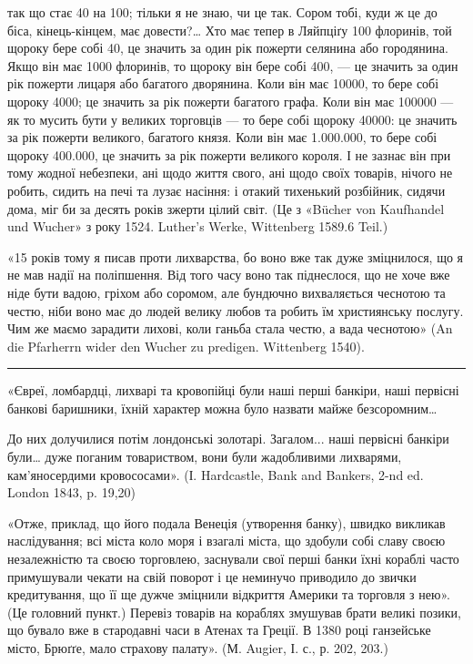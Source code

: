 \parcont{}  %
так що стає 40 на 100; тільки я не знаю, чи це так. Сором тобі, куди ж це
до біса, кінець-кінцем, має довести?\dots{} Хто має тепер в Ляйпціґу 100 флоринів,
той щороку бере собі 40, це значить за один рік пожерти селянина або городянина.
Якщо він має 1000 флоринів, то щороку він бере собі 400, — це значить
за один рік пожерти лицаря або багатого дворянина. Коли він має 10000, то
бере собі щороку 4000; це значить за рік пожерти багатого графа. Коли він
має 100000 — як то мусить бути у великих торговців — то бере собі щороку
40000: це значить за рік пожерти великого, багатого князя. Коли він має
1.000.000, то бере собі щороку 400.000, це значить за рік пожерти великого
короля. І не зазнає він при тому жодної небезпеки, ані щодо життя свого, ані
щодо своїх товарів, нічого не робить, сидить на печі та лузає насіння: і отакий
тихенький розбійник, сидячи дома, міг би за десять років зжерти цілий світ.
(Це з «Bücher von Kaufhandel und Wucher» з року 1524. Luther’s Werke, Wittenberg
1589.6 Teil.)

«15 років тому я писав проти лихварства, бо воно вже так дуже зміцнилося,
що я не мав надії на поліпшення. Від того часу воно так піднеслося, що
не хоче вже ніде бути вадою, гріхом або соромом, але бундючно вихваляється
чеснотою та честю, ніби воно має до людей велику любов та робить їм християнську
послугу. Чим же маємо зарадити лихові, коли ганьба стала честю, а
вада чеснотою» (An die Pfarherrn wider den Wucher zu predigen. Wittenberg 1540).

\pfbreak

«Євреї, ломбардці, лихварі та кровопійці були наші перші банкіри, наші
первісні банкові баришники, їхній характер можна було назвати майже безсоромним\dots{}

До них долучилися потім лондонські золотарі. Загалом... наші первісні
банкіри були\dots{} дуже поганим товариством, вони були жадобливими лихварями,
кам’яносердими кровососами». (І. Hardcastle, Bank and Bankers, 2-nd ed. London
1843, p. 19,20)

«Отже, приклад, що його подала Венеція (утворення банку), швидко викликав
наслідування; всі міста коло моря і взагалі міста, що здобули собі
славу своєю незалежністю та своєю торговлею, заснували свої перші банки
їхні кораблі часто примушували чекати на свій поворот і це неминучо приводило
до звички кредитування, що її ще дужче зміцнили відкриття Америки та
торговля з нею». (Це головний пункт.) Перевіз товарів на кораблях змушував
брати великі позики, що бувало вже в стародавні часи в Атенах та Греції.
В 1380 році ганзейське місто, Брюґґе, мало страхову палату». (М. Augier, І. с., р.
202, 203.)


